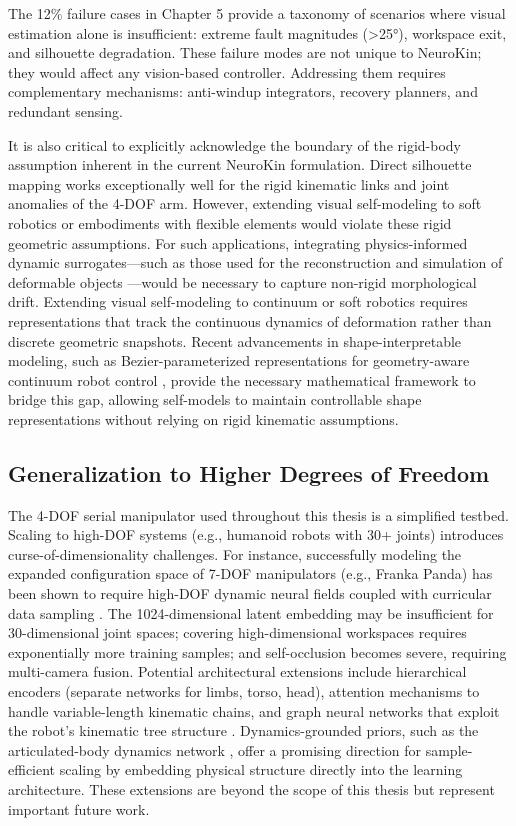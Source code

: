 \documentclass[12pt,a4paper,oneside]{report}
\begin{document}
The 12\% failure cases in Chapter 5 provide a taxonomy of scenarios where visual estimation alone is insufficient: extreme fault magnitudes (>25°), workspace exit, and silhouette degradation. These failure modes are not unique to NeuroKin; they would affect any vision-based controller. Addressing them requires complementary mechanisms: anti-windup integrators, recovery planners, and redundant sensing.

It is also critical to explicitly acknowledge the boundary of the rigid-body assumption inherent in the current NeuroKin formulation. Direct silhouette mapping works exceptionally well for the rigid kinematic links and joint anomalies of the 4-DOF arm. However, extending visual self-modeling to soft robotics or embodiments with flexible elements would violate these rigid geometric assumptions. For such applications, integrating physics-informed dynamic surrogates—such as those used for the reconstruction and simulation of deformable objects \cite{jiang2024phystwin}—would be necessary to capture non-rigid morphological drift. Extending visual self-modeling to continuum or soft robotics requires representations that track the continuous dynamics of deformation rather than discrete geometric snapshots. Recent advancements in shape-interpretable modeling, such as Bezier-parameterized representations for geometry-aware continuum robot control \cite{yu2024shape}, provide the necessary mathematical framework to bridge this gap, allowing self-models to maintain controllable shape representations without relying on rigid kinematic assumptions.

\subsection{Generalization to Higher Degrees of Freedom}

The 4-DOF serial manipulator used throughout this thesis is a simplified testbed. Scaling to high-DOF systems (e.g., humanoid robots with 30+ joints) introduces curse-of-dimensionality challenges. For instance, successfully modeling the expanded configuration space of 7-DOF manipulators (e.g., Franka Panda) has been shown to require high-DOF dynamic neural fields coupled with curricular data sampling \cite{schulze2024high}. The 1024-dimensional latent embedding may be insufficient for 30-dimensional joint spaces; covering high-dimensional workspaces requires exponentially more training samples; and self-occlusion becomes severe, requiring multi-camera fusion. Potential architectural extensions include hierarchical encoders (separate networks for limbs, torso, head), attention mechanisms to handle variable-length kinematic chains, and graph neural networks that exploit the robot's kinematic tree structure \cite{patel2024getzero}. Dynamics-grounded priors, such as the articulated-body dynamics network \cite{rajeswaran2025embodiedynamics}, offer a promising direction for sample-efficient scaling by embedding physical structure directly into the learning architecture. These extensions are beyond the scope of this thesis but represent important future work.
\end{document}
